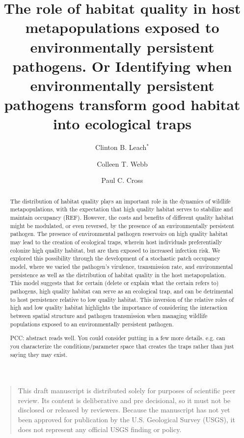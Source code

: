 \documentclass{article}
\begin{document}
\title{The role of habitat quality in host metapopulations exposed to environmentally persistent pathogens. Or Identifying when environmentally persistent pathogens transform good habitat into ecological traps}


\author[1]{Clinton B. Leach$^*$}
\author[1]{Colleen T. Webb}
\author[2]{Paul C. Cross}


\maketitle


\begin{quote}
This draft manuscript is distributed solely for purposes of scientific peer review.  Its content is deliberative and pre decisional, so it must not be disclosed or released by reviewers.  Because the manuscript has not yet been approved for publication by the U.S. Geological Survey (USGS), it does not represent any official USGS finding or policy.
\end{quote}


\begin{abstract} 
The distribution of habitat quality plays an important role in the dynamics of wildlife metapopulations, with the expectation that high quality habitat serves to stabilize and maintain occupancy (REF).  However, the costs and benefits of different quality habitat might be modulated, or even reversed, by the presence of an environmentally persistent pathogen.  The presence of environmental pathogen reservoirs on high quality habitat may lead to the creation of ecological traps, wherein host individuals preferentially colonize high quality habitat, but are then exposed to increased infection risk.  We explored this possibility through the development of a stochastic patch occupancy model, where we varied the pathogen's virulence, transmission rate, and environmental persistence as well as the distribution of habitat quality in the host metapopulation.  This model suggests that for certain (delete or explain what the certain refers to) pathogens, high quality habitat can serve as an ecological trap, and can be detrimental to host persistence relative to low quality habitat.  This inversion of the relative roles of high and low quality habitat highlights the importance of considering the interaction between spatial structure and pathogen transmission when managing wildlife populations exposed to an environmentally persistent pathogen.

PCC: abstract reads well. You could consider putting in a few more details. e.g. can you characterize the conditions/parameter space that creates the traps rather than just saying they may exist. 

\end{abstract}
\end{document}
